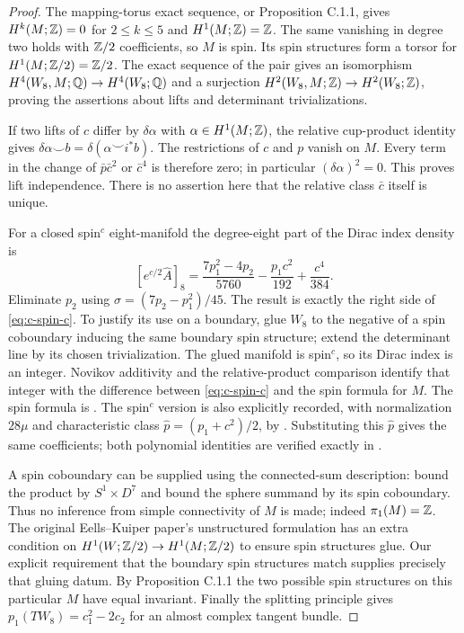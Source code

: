 \begin{proof}
The mapping-torus exact sequence, or Proposition C.1.1, gives
$H^k(M;\mathbb Z)=0$ for $2\leq k\leq5$ and $H^1(M;\mathbb Z)=\mathbb Z$.
The same vanishing in degree two holds with $\mathbb Z/2$ coefficients,
so $M$ is spin. Its spin structures form a torsor for
$H^1(M;\mathbb Z/2)=\mathbb Z/2$. The exact sequence of the pair gives an
isomorphism
$H^4(W_8,M;\mathbb Q)\to H^4(W_8;\mathbb Q)$ and a surjection
$H^2(W_8,M;\mathbb Z)\to H^2(W_8;\mathbb Z)$, proving the assertions
about lifts and determinant trivializations.

If two lifts of $c$ differ by $\delta\alpha$ with
$\alpha\in H^1(M;\mathbb Z)$, the relative cup-product identity gives
$\delta\alpha\smile b=\delta(\alpha\smile i^*b)$.
The restrictions of $c$ and $p$ vanish on $M$. Every term in the
change of $\bar p\bar c^2$ or $\bar c^4$ is therefore zero;
in particular $(\delta\alpha)^2=0$. This proves lift independence.
There is no assertion here that the relative class $\bar c$ itself
is unique.

For a closed spin$^c$ eight-manifold the degree-eight part of the
Dirac index density is
\[
 [e^{c/2}\widehat A]_8
 =\frac{7p_1^2-4p_2}{5760}
       -\frac{p_1c^2}{192}+\frac{c^4}{384}.
\]
Eliminate $p_2$ using $\sigma=(7p_2-p_1^2)/45$.
The result is exactly the right side of
\eqref{eq:c-spin-c}. To justify its use on a boundary, glue $W_8$
to the negative of a spin coboundary inducing the same boundary spin
structure; extend the determinant line by its chosen trivialization.
The glued manifold is spin$^c$, so its Dirac index is an integer.
Novikov additivity and the relative-product comparison identify that
integer with the difference between \eqref{eq:c-spin-c} and the
spin formula for $M$. The spin formula is
\citet[Section 6, equation (11)]{EellsKuiper1962}.
The spin$^c$ version is also explicitly recorded, with normalization
$28\mu$ and characteristic class
$\widehat p=(p_1+c^2)/2$, by
\citet[Section 2.2, equation (2.1)]{CrowleyNordstrom2020}.
Substituting this $\widehat p$ gives the same coefficients; both
polynomial identities are verified exactly in .

A spin coboundary can be supplied using the connected-sum description:
bound the product by $S^1\times D^7$ and bound the sphere summand
by its spin coboundary. Thus no inference from simple connectivity of
$M$ is made; indeed $\pi_1(M)=\mathbb Z$. The original Eells--Kuiper
paper's unstructured formulation has an extra condition on
$H^1(W;\mathbb Z/2)\to H^1(M;\mathbb Z/2)$ to ensure spin structures glue.
Our explicit requirement that the boundary spin structures match
supplies precisely that gluing datum. By Proposition C.1.1 the two
possible spin structures on this particular $M$ have equal invariant.
Finally the splitting principle gives
$p_1(TW_8)=c_1^2-2c_2$ for an almost complex tangent bundle.
\end{proof}

